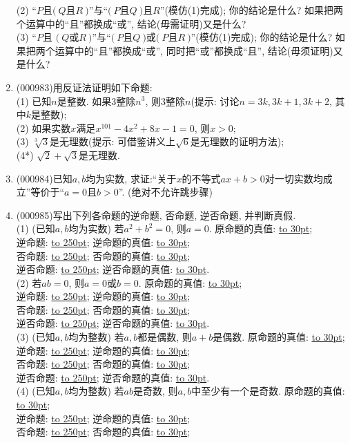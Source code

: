 \documentclass[10pt,a4paper]{article}
\newcommand{\blank}[1]{\underline{\hbox to #1pt{}}}
\begin{document}
\begin{enumerate}[1.]
(2) ``$P$且$(\ Q$且$R\ )$''与``$(\ P$且$Q\ )$且$R$''(模仿(1)完成); 你的结论是什么? 如果把两个运算中的``且''都换成``或'', 结论(毋需证明)又是什么?\\ 
(3) ``$P$且 $(\ Q$或$R\ )$''与``$(\ P$且$Q\ )$或$(\ P$且$R\ )$''(模仿(1)完成); 你的结论是什么? 如果把两个运算中的``且''都换成``或'', 同时把``或''都换成``且'', 结论(毋须证明)又是什么?
\item {\tiny (000983)}用反证法证明如下命题:\\ 
(1) 已知$n$是整数. 如果$3$整除$n^3$, 则$3$整除$n$(提示: 讨论$n=3k,3k+1,3k+2$, 其中$k$是整数);\\ 
(2) 如果实数$x$满足$x^{101}-4x^2+8x-1=0$, 则$x>0$;\\ 
(3) $\sqrt[3]{3}$是无理数(提示: 可借鉴讲义上$\sqrt{6}$是无理数的证明方法);\\ 
(4*) $\sqrt{2}+\sqrt{3}$是无理数.
\item {\tiny (000984)}已知$a,b$均为实数, 求证:``关于$x$的不等式$ax+b>0$对一切实数均成立''等价于``$a=0$且$b>0$''. (绝对不允许跳步骤)
\item {\tiny (000985)}写出下列各命题的逆命题, 否命题, 逆否命题, 并判断真假.\\ 
(1) (已知$a,b$均为实数) 若$a^2+b^2=0$, 则$a=0$. 原命题的真值: \blank{30};\\ 
逆命题: \blank{250}; 逆命题的真值: \blank{30};\\ 
否命题: \blank{250}; 否命题的真值: \blank{30};\\ 
逆否命题: \blank{250}; 逆否命题的真值: \blank{30}.\\ 
(2) 若$ab=0$, 则$a=0$或$b=0$. 原命题的真值: \blank{30};\\ 
逆命题: \blank{250}; 逆命题的真值: \blank{30};\\ 
否命题: \blank{250}; 否命题的真值: \blank{30};\\ 
逆否命题: \blank{250}; 逆否命题的真值: \blank{30}.\\ 
(3) (已知$a,b$均为整数) 若$a,b$都是偶数, 则$a+b$是偶数. 原命题的真值: \blank{30};\\ 
逆命题: \blank{250}; 逆命题的真值: \blank{30};\\ 
否命题: \blank{250}; 否命题的真值: \blank{30};\\ 
逆否命题: \blank{250}; 逆否命题的真值: \blank{30}.\\ 
(4) (已知$a,b$均为整数) 若$ab$是奇数, 则$a,b$中至少有一个是奇数. 原命题的真值: \blank{30};\\ 
逆命题: \blank{250}; 逆命题的真值: \blank{30};\\ 
否命题: \blank{250}; 否命题的真值: \blank{30};\\ 

\end{enumerate}
\end{document}
